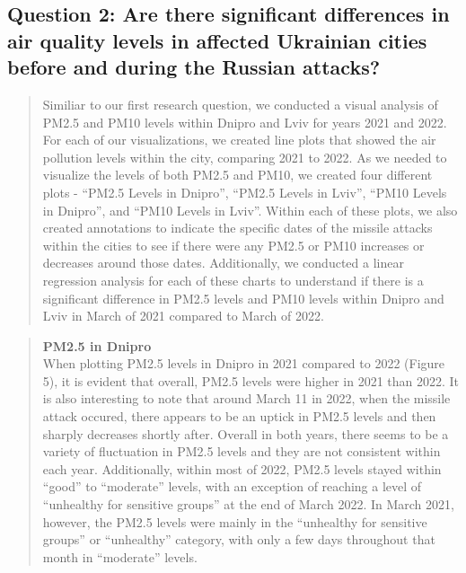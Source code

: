 \documentclass[
  12pt,
]{article}
\begin{document}
\newpage

\hypertarget{question-2-are-there-significant-differences-in-air-quality-levels-in-affected-ukrainian-cities-before-and-during-the-russian-attacks}{%
\subsection{Question 2: Are there significant differences in air quality
levels in affected Ukrainian cities before and during the Russian
attacks?}\label{question-2-are-there-significant-differences-in-air-quality-levels-in-affected-ukrainian-cities-before-and-during-the-russian-attacks}}

\begin{quote}
Similiar to our first research question, we conducted a visual analysis
of PM2.5 and PM10 levels within Dnipro and Lviv for years 2021 and 2022.
For each of our visualizations, we created line plots that showed the
air pollution levels within the city, comparing 2021 to 2022. As we
needed to visualize the levels of both PM2.5 and PM10, we created four
different plots - ``PM2.5 Levels in Dnipro'', ``PM2.5 Levels in Lviv'',
``PM10 Levels in Dnipro'', and ``PM10 Levels in Lviv''. Within each of
these plots, we also created annotations to indicate the specific dates
of the missile attacks within the cities to see if there were any PM2.5
or PM10 increases or decreases around those dates. Additionally, we
conducted a linear regression analysis for each of these charts to
understand if there is a significant difference in PM2.5 levels and PM10
levels within Dnipro and Lviv in March of 2021 compared to March of
2022.\\
\end{quote}

\begin{quote}
\textbf{PM2.5 in Dnipro}\\
When plotting PM2.5 levels in Dnipro in 2021 compared to 2022 (Figure
5), it is evident that overall, PM2.5 levels were higher in 2021 than
2022. It is also interesting to note that around March 11 in 2022, when
the missile attack occured, there appears to be an uptick in PM2.5
levels and then sharply decreases shortly after. Overall in both years,
there seems to be a variety of fluctuation in PM2.5 levels and they are
not consistent within each year. Additionally, within most of 2022,
PM2.5 levels stayed within ``good'' to ``moderate'' levels, with an
exception of reaching a level of ``unhealthy for sensitive groups'' at
the end of March 2022. In March 2021, however, the PM2.5 levels were
mainly in the ``unhealthy for sensitive groups'' or ``unhealthy''
category, with only a few days throughout that month in ``moderate''
levels.
\end{quote}
\end{document}
